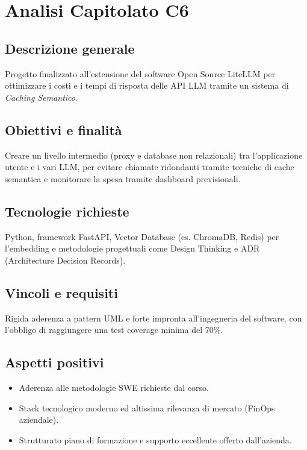 \documentclass[a4paper, 11pt]{article}
\begin{document}
\section{Analisi Capitolato C6}

\subsection{Descrizione generale}
Progetto finalizzato all'estensione del software Open Source LiteLLM per ottimizzare i costi e i tempi di risposta delle API LLM tramite un sistema di \textit{Caching Semantico}.

\subsection{Obiettivi e finalità}
Creare un livello intermedio (proxy e database non relazionali) tra l'applicazione utente e i vari LLM, per evitare chiamate ridondanti tramite tecniche di cache semantica e monitorare la spesa tramite dashboard previsionali.

\subsection{Tecnologie richieste}
Python, framework FastAPI, Vector Database (es. ChromaDB, Redis) per l'embedding e metodologie progettuali come Design Thinking e ADR (Architecture Decision Records).

\subsection{Vincoli e requisiti}
Rigida aderenza a pattern UML e forte impronta all'ingegneria del software, con l'obbligo di raggiungere una test coverage minima del 70\%.

\subsection{Aspetti positivi}
\begin{itemize}[label=-]
    \item Aderenza alle metodologie SWE richieste dal corso.
    \item Stack tecnologico moderno ed altissima rilevanza di mercato (FinOps aziendale).
    \item Strutturato piano di formazione e supporto eccellente offerto dall'azienda.
\end{itemize}
\end{document}
